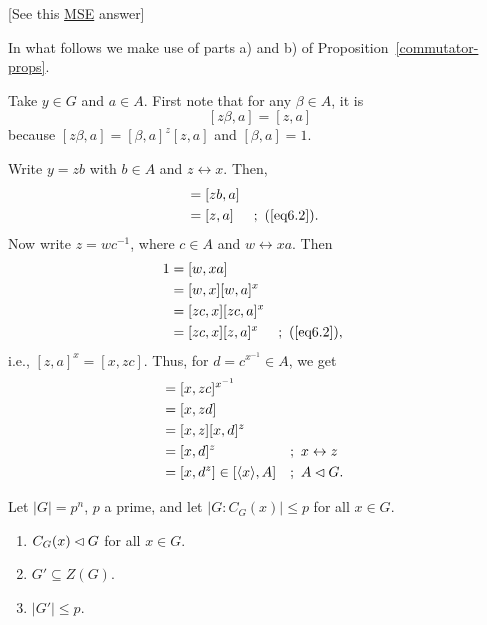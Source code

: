 \begin{solution} {[See this \href{https://math.stackexchange.com/a/1484227/269050}{MSE} answer]}

In what follows we make use of parts a) and b) of Proposition~\ref{commutator-props}.

Take $y\in G$ and $a\in A$. First note that for any $\beta\in A$, it is
\begin{equation}\label{eq6.2}
    [z\beta,a] = [z,a]
\end{equation}
because $[z\beta,a]=[\beta,a]^z[z,a]$ and $[\beta,a]=1$.

Write $y=zb$ with $b\in A$ and $z\leftrightarrow x$. Then,
\begin{align*}
    [y,a] &= [zb,a]\\
        &= [z,a]    &&;\ (\ref{eq6.2}).
\end{align*}
Now write $z=wc^{-1}$, where $c\in A$ and $w\leftrightarrow xa$. Then
\begin{align*}
    1 &= [w,xa]\\
        &= [w,x][w,a]^x\\
        &= [zc,x][zc,a]^x\\
        &= [zc,x][z,a]^x    &&;\ (\ref{eq6.2}),
\end{align*}
i.e., $[z,a]^x=[x,zc]$. Thus, for $d=c^{x^{-1}}\in A$, we get
\begin{align*}
    [z,a] &= [x,zc]^{x^{-1}}\\
        &= [x,zd]\\
        &= [x,z][x,d]^z\\
        &= [x,d]^z  &&;\ x\leftrightarrow z\\
        &= [x,d^z] \in [\gen x,A]   &&;\ A\normal G.
\end{align*}
 \end{solution}

\begin{exr}\label{exercise-1.5.3}
    Let\/ $|G| = p^n$, $p$ a prime, and let\/ $|G:C_G(x)|\le p$ for all\/ $x\in G$.
    \begin{enumerate}[\upshape a)]
      \item $C_G(x) \lhd G$ for all\/ $x\in G$.
      \item $G' \subseteq Z(G)$.
      \item \textrm{\upshape [Knoche]} $|G'|\le p$.
    \end{enumerate}
\end{exr}

